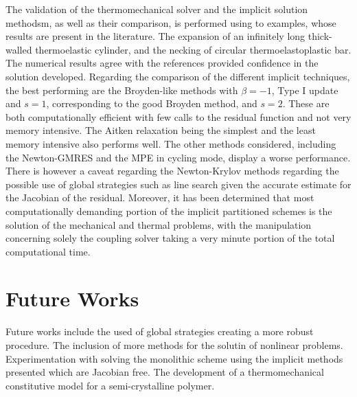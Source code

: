 The validation of the thermomechanical solver and the implicit solution methodsm, as well as their comparison, is performed using to examples, whose results are present in the literature.
The expansion of an infinitely long thick-walled thermoelastic cylinder, and the necking of circular thermoelastoplastic bar.
The numerical results agree with the references provided confidence in the solution developed.
Regarding the comparison of the different implicit techniques, the best performing are the Broyden-like methods with \(\beta=-1\), Type I update and \(s=1\), corresponding to the good Broyden method, and \(s=2\).
These are both computationally efficient with few calls to the residual function and not very memory intensive.
The Aitken relaxation being the simplest and the least memory intensive also performs well.
The other methods considered, including the Newton-GMRES and the MPE in cycling mode, display a worse performance.
There is however a caveat regarding the Newton-Krylov methods regarding the possible use of global strategies such as line search given the accurate estimate for the Jacobian of the residual.
Moreover, it has been determined that most computationally demanding portion of the implicit partitioned schemes is the solution of the mechanical and thermal problems, with the manipulation concerning solely the coupling solver taking a very minute portion of the total computational time.

\section{Future Works}

Future works include the used of global strategies creating a more robust procedure.
The inclusion of more methods for the solutin of nonlinear problems.
Experimentation with solving the monolithic scheme using the implicit methods presented which are Jacobian free.
The development of a thermomechanical constitutive model for a semi-crystalline polymer.

